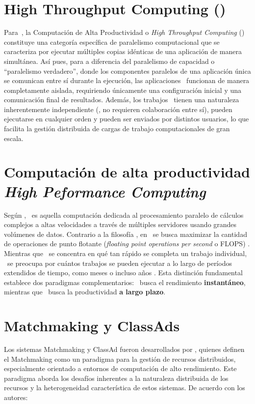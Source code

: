 \section{High Throughput Computing (\HTC)}
\noindent
Para~\cite{Morgan2009}, la Computación de Alta Productividad o \textit{High Throughput Computing} (\HTC) constituye una categoría específica de paralelismo computacional que se caracteriza por ejecutar múltiples copias idénticas de una aplicación de manera simultánea. Así pues, para \cite{Morgan2009} a diferencia del paralelismo de capacidad o ``paralelismo verdadero'', donde los componentes paralelos de una aplicación única se comunican entre sí durante la ejecución, las aplicaciones \HTC~funcionan de manera completamente aislada, requiriendo únicamente una configuración inicial y una comunicación final de resultados. Además, los trabajos \HTC~tienen una naturaleza inherentemente independiente (\ie, no requieren colaboración entre sí), pueden ejecutarse en cualquier orden y pueden ser enviados por distintos usuarios, lo que facilita la gestión distribuida de cargas de trabajo computacionales de gran escala.

\section{Computación de alta productividad \textit{High Peformance Computing} \HPC}

\noindent
Según \cite{SK2023}, \HPC~es aquella computación dedicada al procesamiento paralelo de cálculos complejos a altas velocidades a través de múltiples servidores usando grandes volúmenes de datos. Contrario a la filosofía \HTC, en \HPC~se busca maximizar la cantidad de operaciones de punto flotante (\textit{floating point operations per second} o FLOPS) \citep{HTCondor-what-is-htc}. Mientras que \HPC~se concentra en qué tan rápido se completa un trabajo individual, \HTC~se preocupa por cuántos trabajos se pueden ejecutar a lo largo de períodos extendidos de tiempo, como meses o incluso años \citep{Raman1998}. Esta distinción fundamental establece dos paradigmas complementarios: \HPC~busca el rendimiento \textbf{instantáneo}, mientras que \HTC~busca la productividad \textbf{a largo plazo}.

\section{Matchmaking y ClassAds}
Los sistemas Matchmaking y ClassAd fueron desarrollados por \cite{Raman1998}, quienes definen el Matchmaking como un paradigma para la gestión de recursos distribuidos, especialmente orientado a entornos de computación de alto rendimiento. Este paradigma aborda los desafíos inherentes a la naturaleza distribuida de los recursos y la heterogeneidad característica de estos sistemas. De acuerdo con los autores:

